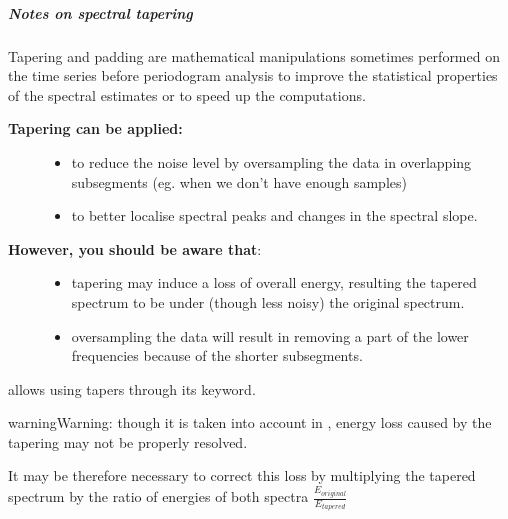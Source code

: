 \documentclass[letterpaper,10pt,english]{sphinxmanual}
\begin{document}
\subparagraph{Notes on spectral tapering}
\label{altimetry.tools.spectrum:notes-on-spectral-tapering}
Tapering and padding are mathematical manipulations sometimes performed on the time series before periodogram analysis to improve the statistical properties of the spectral estimates or to speed up the computations.
\begin{description}
\item[{\textbf{Tapering can be applied:}}] \leavevmode\begin{itemize}
\item {} 
to reduce the noise level by oversampling the data in overlapping subsegments (eg. when we don't have enough samples)

\item {} 
to better localise spectral peaks and changes in the spectral slope.

\end{itemize}

\item[{\textbf{However, you should be aware that}:}] \leavevmode\begin{itemize}
\item {} 
tapering may induce a loss of overall energy, resulting the tapered spectrum to be under (though less noisy) the original spectrum.

\item {} 
oversampling the data will result in removing a part of the lower frequencies because of the shorter subsegments.

\end{itemize}

\end{description}

{\hyperref[altimetry.tools.spectrum:altimetry.tools.spectrum.preprocess]{\emph{}}} allows using tapers through its  keyword.

\begin{notice}{warning}{Warning:}
though it is taken into account in {\hyperref[altimetry.tools.spectrum:altimetry.tools.spectrum.spectral_analysis]{\emph{}}}, energy loss caused by the tapering may not be properly resolved.

It may be therefore necessary to correct this loss by multiplying the tapered spectrum by the ratio of energies of both spectra \(\frac{E_{original}}{E_{tapered}}\)
\end{notice}
\end{document}
